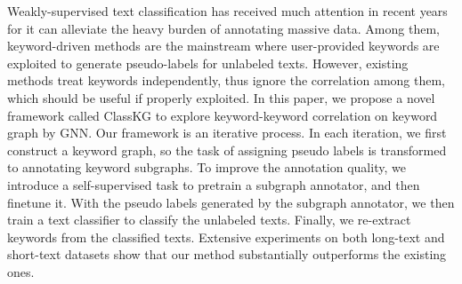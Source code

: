 Weakly-supervised text classification has received much attention in recent years for it can alleviate the heavy burden of annotating massive data. Among them, keyword-driven methods are the mainstream where user-provided keywords are exploited to generate pseudo-labels for unlabeled texts. However, existing methods treat keywords independently, thus ignore the correlation among them, which should be useful if properly exploited. In this paper, we propose a novel framework called ClassKG to explore keyword-keyword correlation on keyword graph by GNN. Our framework is an iterative process. In each iteration, we first construct a keyword graph, so the task of assigning pseudo labels is transformed to annotating keyword subgraphs. To improve the annotation quality, we introduce a self-supervised task to pretrain a subgraph annotator, and then finetune it. With the pseudo labels generated by the subgraph annotator, we then train a text classifier to classify the unlabeled texts. Finally, we re-extract keywords from the classified texts. Extensive experiments on both long-text and short-text datasets show that our method substantially outperforms the existing ones.
